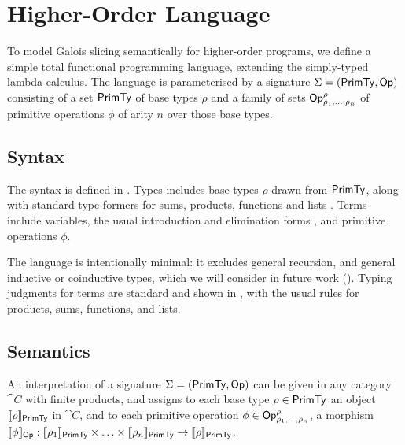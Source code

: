 \section{Higher-Order Language}
\label{sec:language}

To model Galois slicing semantically for higher-order programs, we define a simple total functional
programming language, extending the simply-typed lambda calculus. The language is parameterised by a signature
$\Sigma = (\mathsf{PrimTy}, \mathsf{Op})$ consisting of a set $\mathsf{PrimTy}$ of base types $\rho$ and a family of sets
$\mathsf{Op}^\rho_{\rho_1,\ldots,\rho_n}$ of primitive operations $\phi$ of arity $n$ over those base types.

\subsection{Syntax}
\label{sec:language:syntax}

The syntax is defined in . Types includes base types $\rho$ drawn from $\mathsf{PrimTy}$, along with
standard type formers for sums, products, functions and lists%
. Terms include
variables, the usual introduction and elimination forms%
, and
primitive operations $\phi$.

The language is intentionally minimal: it excludes general recursion, and general inductive or coinductive
types, which we will consider in future work (). Typing judgments for terms are standard
and shown in , with the usual rules for products, sums, functions, and lists.




\subsection{Semantics}
\label{sec:language:semantics}



An interpretation of a signature $\Sigma = (\mathsf{PrimTy}, \mathsf{Op})$ can be given in any category $\cat{C}$ with
finite products, and assigns to each base type $\rho \in \mathsf{PrimTy}$ an object $\llbracket \rho \rrbracket_{\mathsf{PrimTy}}$ in
$\cat{C}$, and to each primitive operation $\phi \in \mathsf{Op}^\rho_{\rho_1,\ldots,\rho_n}$, a morphism
$\llbracket \phi \rrbracket_{\mathsf{Op}}: \llbracket \rho_1 \rrbracket_{\mathsf{PrimTy}} \times \ldots \times \llbracket \rho_n \rrbracket_{\mathsf{PrimTy}} \to
\llbracket \rho \rrbracket_{\mathsf{PrimTy}}$.

